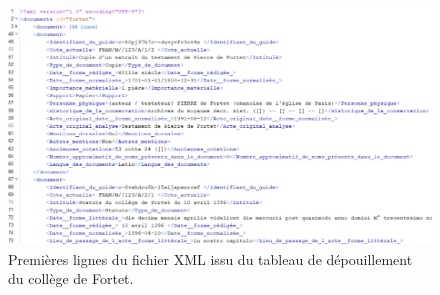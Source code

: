 \begin{figure}[!h]
    \centering
    \includegraphics[width=1\linewidth]{images/tableau-fortet-xml.png}
    \caption{Premières lignes du fichier XML issu du tableau de dépouillement du collège de Fortet.}
    \label{fig:xml-fortet}
\end{figure}

